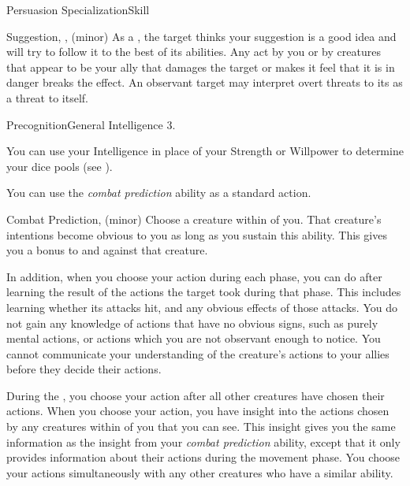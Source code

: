 \begin{feat}{Persuasion Specialization}{Skill}
\begin{sustainability}{Suggestion}{, ,  (minor)}
            \hit As a , the target thinks your suggestion is a good idea and will try to follow it to the best of its abilities.
            Any act by you or by creatures that appear to be your ally that damages the target or makes it feel that it is in danger breaks the effect.
            An observant target may interpret overt threats to its  as a threat to itself.
        \end{sustainability}
    \end{feat}

    \begin{feat}{Precognition}{General}
        \featpre Intelligence 3.

         You can use your Intelligence in place of your Strength or Willpower to determine your dice pools (see ).

         You can use the \textit{combat prediction} ability as a standard action.
        \begin{sustainability}{Combat Prediction}{,  (minor)}
            \rankline
            Choose a creature within \medrange of you.
            That creature's intentions become obvious to you as long as you sustain this ability.
            This gives you a  bonus to  and  against that creature.

            In addition, when you choose your action during each phase, you can do after learning the result of the actions the target took during that phase.
            This includes learning whether its attacks hit, and any obvious effects of those attacks.
            You do not gain any knowledge of actions that have no obvious signs, such as purely mental actions, or actions which you are not observant enough to notice.
            You cannot communicate your understanding of the creature's actions to your allies before they decide their actions.
        \end{sustainability}

         During the , you choose your action after all other creatures have chosen their actions.
        When you choose your action, you have insight into the actions chosen by any creatures within \longrange of you that you can see.
        This insight gives you the same information as the insight from your \textit{combat prediction} ability, except that it only provides information about their actions during the movement phase.
        You choose your actions simultaneously with any other creatures who have a similar ability.


\end{feat}
